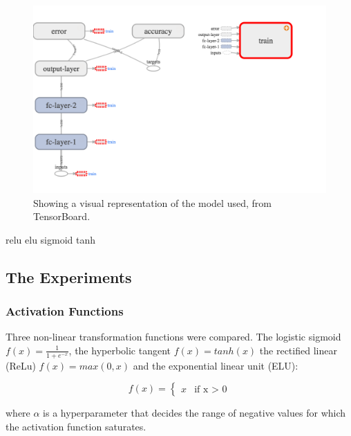 \documentclass[]{article}
\begin{document}
\begin{figure}[h]
	\includegraphics[width=\textwidth]{model_1}
	\caption{Showing a visual representation of the model used, from TensorBoard.}
	\label{part1-model}
	\centering
\end{figure}

relu
elu
sigmoid
tanh


\subsection{The Experiments}


\subsubsection{Activation Functions}

Three non-linear transformation functions were compared. The logistic sigmoid $f(x)=\frac{1}{1+e^{-x}}$, the hyperbolic tangent $f(x)=tanh(x)$ the rectified linear (ReLu) $f(x)=max(0,x)$ and the exponential linear unit (ELU):

\begin{equation} \label{eq:elu}
f(x) = \begin{cases}
x &\text{if x > 0}
\end{cases}
\end{equation}

where \(\alpha\) is a hyperparameter that decides the range of negative values for which the activation function saturates.
\end{document}
